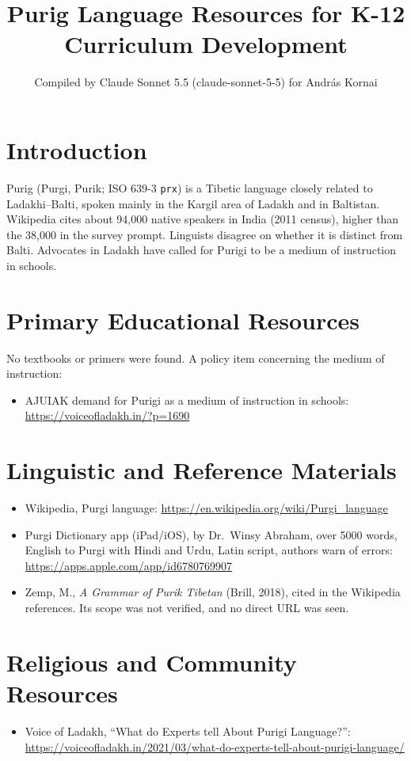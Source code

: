 \documentclass[12pt]{article}
\title{Purig Language Resources for K-12 Curriculum Development}
\author{Compiled by Claude Sonnet 5.5 (claude-sonnet-5-5) for Andr\'as Kornai}
\date{}
\begin{document}
\maketitle

\section{Introduction}
Purig (Purgi, Purik; ISO 639-3 \texttt{prx}) is a Tibetic language closely related to Ladakhi--Balti, spoken mainly in the Kargil area of Ladakh and in Baltistan. Wikipedia cites about 94,000 native speakers in India (2011 census), higher than the 38,000 in the survey prompt. Linguists disagree on whether it is distinct from Balti. Advocates in Ladakh have called for Purigi to be a medium of instruction in schools.

\section{Primary Educational Resources}
No textbooks or primers were found. A policy item concerning the medium of instruction:
\begin{itemize}
\item AJUIAK demand for Purigi as a medium of instruction in schools: \url{https://voiceofladakh.in/?p=1690}
\end{itemize}

\section{Linguistic and Reference Materials}
\begin{itemize}
\item Wikipedia, Purgi language: \url{https://en.wikipedia.org/wiki/Purgi_language}
\item Purgi Dictionary app (iPad/iOS), by Dr.\ Winsy Abraham, over 5000 words, English to Purgi with Hindi and Urdu, Latin script, authors warn of errors: \url{https://apps.apple.com/app/id6780769907}
\item Zemp, M., \emph{A Grammar of Purik Tibetan} (Brill, 2018), cited in the Wikipedia references. Its scope was not verified, and no direct URL was seen.
\end{itemize}

\section{Religious and Community Resources}
\begin{itemize}
\item Voice of Ladakh, ``What do Experts tell About Purigi Language?'': \url{https://voiceofladakh.in/2021/03/what-do-experts-tell-about-purigi-language/}
\end{itemize}
\end{document}
